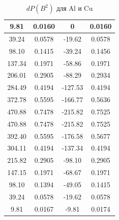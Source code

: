 \documentclass[a4paper, 12pt]{article}
\begin{document}
\begin{table}[htbp]
\begin{subtable}[t]{0.45\textwidth}
\begin{tabular}{|c|c|c|c|}
        9.81   & 0.0160  & 0      & 0.0160  \\ \hline
        39.24  & 0.0578  & -19.62 & 0.0578  \\ \hline
        98.10  & 0.1415  & -39.24 & 0.1456  \\ \hline
        137.34 & 0.1971  & -58.86 & 0.1971  \\ \hline
        206.01 & 0.2905  & -88.29 & 0.2934  \\ \hline
        284.49 & 0.4194  & -127.53 & 0.4194  \\ \hline
        372.78 & 0.5595  & -166.77 & 0.5636  \\ \hline
        470.88 & 0.7478  & -215.82 & 0.7525  \\ \hline
        470.88 & 0.7478  & -215.82 & 0.7525  \\ \hline
        392.40 & 0.5595  & -176.58 & 0.5677  \\ \hline
        304.11 & 0.4194  & -137.34 & 0.4194  \\ \hline
        215.82 & 0.2905  & -98.10  & 0.2905  \\ \hline
        147.15 & 0.1971  & -68.67  & 0.1971  \\ \hline
        98.10  & 0.1394  & -49.05  & 0.1415  \\ \hline
        39.24  & 0.0578  & -19.62  & 0.0578  \\ \hline
        9.81   & 0.0167  & -9.81   & 0.0174  \\ \hline
        \end{tabular}
        \caption{$dP(B^2)$ для Al и Cu}
    \end{subtable}
\end{table}
\end{document}
